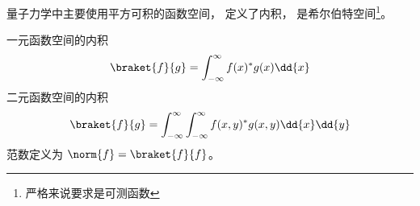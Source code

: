 
量子力学中主要使用平方可积的函数空间， 定义了内积， 是希尔伯特空间\footnote{严格来说要求是可测函数}。

一元函数空间的内积
\begin{equation}
\braket{f}{g} = \int_{-\infty}^{\infty} f(x)^* g(x) \dd{x}
\end{equation}
二元函数空间的内积
\begin{equation}
\braket{f}{g} = \int_{-\infty}^{\infty}\int_{-\infty}^{\infty} f(x, y)^* g(x, y) \dd{x}\dd{y}
\end{equation}
范数定义为 $\norm{f} = \braket{f}{f}$。

